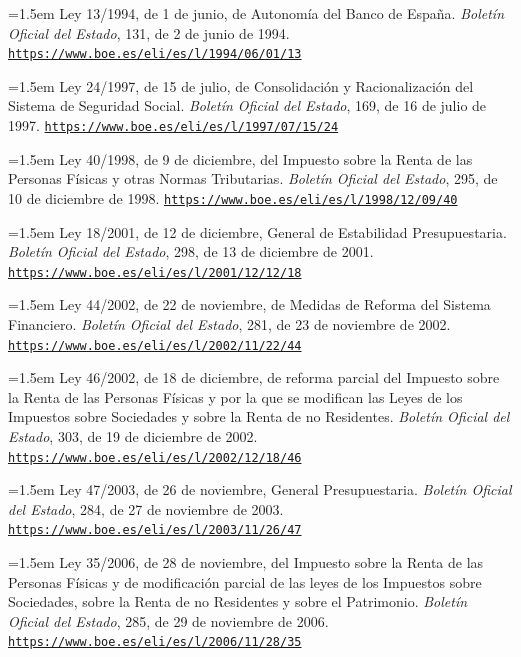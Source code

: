 \documentclass[10pt,a4paper]{article}
\begin{document}
\noindent\hangindent=1.5em Ley 13/1994, de 1 de junio, de Autonomía del Banco de España. \textit{Boletín Oficial del Estado}, 131, de 2 de junio de 1994. \href{https://www.boe.es/eli/es/l/1994/06/01/13}{\nolinkurl{https://www.boe.es/eli/es/l/1994/06/01/13}}

\noindent\hangindent=1.5em Ley 24/1997, de 15 de julio, de Consolidación y Racionalización del Sistema de Seguridad Social. \textit{Boletín Oficial del Estado}, 169, de 16 de julio de 1997. \href{https://www.boe.es/eli/es/l/1997/07/15/24}{\nolinkurl{https://www.boe.es/eli/es/l/1997/07/15/24}}

\noindent\hangindent=1.5em Ley 40/1998, de 9 de diciembre, del Impuesto sobre la Renta de las Personas Físicas y otras Normas Tributarias. \textit{Boletín Oficial del Estado}, 295, de 10 de diciembre de 1998. \href{https://www.boe.es/eli/es/l/1998/12/09/40}{\nolinkurl{https://www.boe.es/eli/es/l/1998/12/09/40}}

\noindent\hangindent=1.5em Ley 18/2001, de 12 de diciembre, General de Estabilidad Presupuestaria. \textit{Boletín Oficial del Estado}, 298, de 13 de diciembre de 2001. \href{https://www.boe.es/eli/es/l/2001/12/12/18}{\nolinkurl{https://www.boe.es/eli/es/l/2001/12/12/18}}

\noindent\hangindent=1.5em Ley 44/2002, de 22 de noviembre, de Medidas de Reforma del Sistema Financiero. \textit{Boletín Oficial del Estado}, 281, de 23 de noviembre de 2002. \href{https://www.boe.es/eli/es/l/2002/11/22/44}{\nolinkurl{https://www.boe.es/eli/es/l/2002/11/22/44}}

\noindent\hangindent=1.5em Ley 46/2002, de 18 de diciembre, de reforma parcial del Impuesto sobre la Renta de las Personas Físicas y por la que se modifican las Leyes de los Impuestos sobre Sociedades y sobre la Renta de no Residentes. \textit{Boletín Oficial del Estado}, 303, de 19 de diciembre de 2002. \href{https://www.boe.es/eli/es/l/2002/12/18/46}{\nolinkurl{https://www.boe.es/eli/es/l/2002/12/18/46}}

\noindent\hangindent=1.5em Ley 47/2003, de 26 de noviembre, General Presupuestaria. \textit{Boletín Oficial del Estado}, 284, de 27 de noviembre de 2003. \href{https://www.boe.es/eli/es/l/2003/11/26/47}{\nolinkurl{https://www.boe.es/eli/es/l/2003/11/26/47}}

\noindent\hangindent=1.5em Ley 35/2006, de 28 de noviembre, del Impuesto sobre la Renta de las Personas Físicas y de modificación parcial de las leyes de los Impuestos sobre Sociedades, sobre la Renta de no Residentes y sobre el Patrimonio. \textit{Boletín Oficial del Estado}, 285, de 29 de noviembre de 2006. \href{https://www.boe.es/eli/es/l/2006/11/28/35}{\nolinkurl{https://www.boe.es/eli/es/l/2006/11/28/35}}
\end{document}
